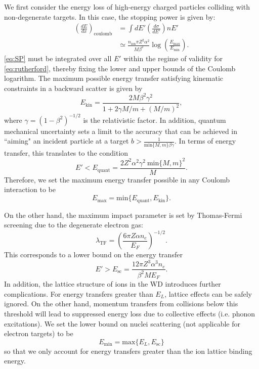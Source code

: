 \documentclass[twocolumn,showpacs,preprintnumbers,amsmath,amssymb,prd]{revtex4}
\def\r{\right)}
\def\l{\left(}
\begin{document}
\begin{appendices}
We first consider the energy loss of high-energy charged particles colliding with non-degenerate targets.
In this case, the stopping power is given by:
\begin{align}
\label{eq:SP}
\l \frac{dE}{dx}\r_\text{coulomb} & =  \int dE' \left(\frac{d \sigma}{dE'}\right) n E' \\
& \simeq \frac{n_\text{ion} \pi Z^2 \alpha^2}{M \beta^2} \log {\l\frac{E_{\text{max}}}{E_{\text{min}}}\r}.
\end{align}
\eqref{eq:SP} must be integrated over all $E'$ within the regime of validity for \eqref{eq:rutherford}, thereby fixing the lower and upper bounds of the Coulomb logarithm.
The maximum possible energy transfer satisfying kinematic constraints in a backward scatter is given by
\begin{equation}
E_{\text{kin}} = \frac{2 M \beta^2 \gamma^2}{1+ 2\gamma M/m +(M/m)^2},
\end{equation}
where $\gamma = (1-\beta^2)^{-1/2}$ is the relativistic factor.
In addition, quantum mechanical uncertainty sets a limit to the accuracy that can be achieved in ``aiming" an incident particle at a target $b > \frac{1}{\text{min}\{{M, m}\} \beta \gamma}$.
In terms of energy transfer, this translates to the condition
\begin{equation}
E' < E_\text{quant} = \frac{2 Z^2 \alpha^2 \gamma^2 ~\text{min}\{{M, m}\}^2}{M}.
\end{equation}
Therefore, we set the maximum energy transfer possible in any Coulomb interaction to be
\begin{equation}
E_{\text{max}} = \text{min}\{E_\text{quant}, E_{\text{kin}}\}.
\end{equation}

On the other hand, the maximum impact parameter is set by Thomas-Fermi screening due to the degenerate electron gas:
\begin{equation}
\label{eq:TF}
\lambda_{\text{TF}} = \l \frac{6 \pi Z \alpha n_e}{E_F}\r^{-1/2}.
\end{equation}
This corresponds to a lower bound on the energy transfer
\begin{equation}
E' > E_{\text{sc}} = \frac{12 \pi Z^3 \alpha ^3 n_e}{\beta^2 M E_F}.
\end{equation}
In addition, the lattice structure of ions in the WD introduces further complications. For energy transfers greater than $E_L$, lattice effects can be safely ignored.
On the other hand, momentum transfers from collisions below this threshold will lead to suppressed energy loss due to collective effects (i.e. phonon excitations).
We set the lower bound on nuclei scattering (not applicable for electron targets) to be
\begin{equation}
E_{\text{min}} = \text{max} \{E_L,E_{\text{sc}}\}
\end{equation}
so that we only account for energy transfers greater than the ion lattice binding energy.


\end{appendices}
\end{document}
